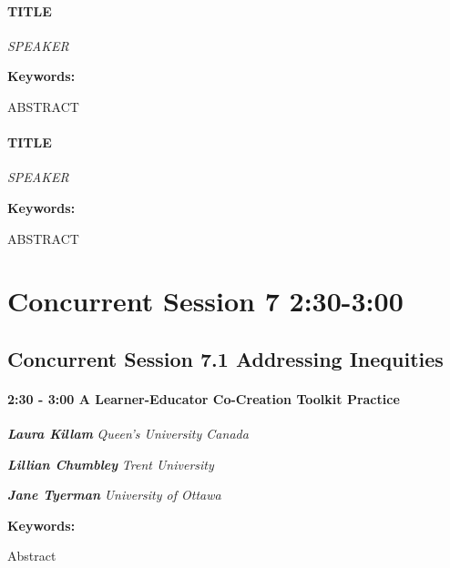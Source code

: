 \documentclass[
]{book}
\begin{document}
\begin{speaker}
\hypertarget{title}{%
\paragraph{\texorpdfstring{\textbf{TITLE}}{TITLE}}\label{title}}

\emph{SPEAKER}

\textbf{Keywords:}

ABSTRACT
\end{speaker}
\begin{speaker}
\hypertarget{title}{%
\paragraph{\texorpdfstring{\textbf{TITLE}}{TITLE}}\label{title}}

\emph{SPEAKER}

\textbf{Keywords:}

ABSTRACT
\end{speaker}

\hypertarget{concurrent-session-7-230-300}{%
\section*{Concurrent Session 7 \textbar{} 2:30-3:00}\label{concurrent-session-7-230-300}}

\hypertarget{concurrent-session-7.1-addressing-inequities}{%
\subsection*{Concurrent Session 7.1 \textbar{} Addressing Inequities}\label{concurrent-session-7.1-addressing-inequities}}

\begin{session}
\hypertarget{a-learner-educator-co-creation-toolkit-practice}{%
\paragraph*{\texorpdfstring{2:30 - 3:00 \textbar{} \textbf{A
Learner-Educator Co-Creation Toolkit} \textbar{}
Practice}{2:30 - 3:00 \textbar{} A Learner-Educator Co-Creation Toolkit \textbar{} Practice}}\label{a-learner-educator-co-creation-toolkit-practice}}

\textbf{\emph{Laura Killam}} \textbar{} \emph{Queen's University Canada}

\textbf{\emph{Lillian Chumbley}} \textbar{} \emph{Trent University }

\textbf{\emph{Jane Tyerman}} \textbar{} \emph{University of Ottawa}

\textbf{Keywords:}

Abstract
\end{session}
\end{document}
